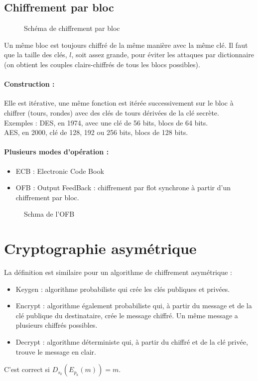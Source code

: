 \documentclass[12pt,a4paper]{report}
\begin{document}
\subsection{Chiffrement par bloc}
\begin{figure}[h]
	\centering
  \scalebox{0.8}{}	
  \caption{Schéma de chiffrement par bloc}
\end{figure}
Un même bloc est toujours chiffré de la même manière avec la même clé. Il faut que la taille des clés, $l$, soit assez grande, pour éviter les attaques par dictionnaire (on obtient les couples clairs-chiffrés de tous les blocs possibles).
\paragraph{Construction :\\}
Elle est itérative, une même fonction est itérée successivement sur le bloc à chiffrer (tours, rondes) avec des clés de tours dérivées de la clé secrète.\\
Exemples : DES, en 1974, avec une clé de 56 bits, blocs de 64 bits.\\
AES, en 2000, clé de 128, 192 ou 256 bits, blocs de 128 bits.
\paragraph{Plusieurs modes d'opération :\\}
\begin{itemize}
\item ECB : Electronic Code Book
\item OFB : Output FeedBack : chiffrement par flot synchrone à partir d'un chiffrement par bloc.
\end{itemize}
\begin{figure}[h]
	\centering
  \scalebox{0.5}{}	
  \caption{Schma de l'OFB}
\end{figure}
\section{Cryptographie asymétrique}
\begin{figure}[h]
	\centering
  \scalebox{0.8}{}	
\end{figure}
La définition est similaire pour un algorithme de chiffrement asymétrique :
\begin{itemize}
\item Keygen : algorithme probabiliste qui crée les clés publiques et privées.
\item Encrypt : algorithme également probabiliste qui, à partir du message et de la clé publique du destinataire, crée le message chiffré. Un même message a plusieurs chiffrés possibles.
\item Decrypt : algorithme déterministe qui, à partir du chiffré et de la clé privée, trouve le message en clair.
\end{itemize}
C'est correct si $D_{s_k}(E_{p_k}(m))=m$.
\end{document}
